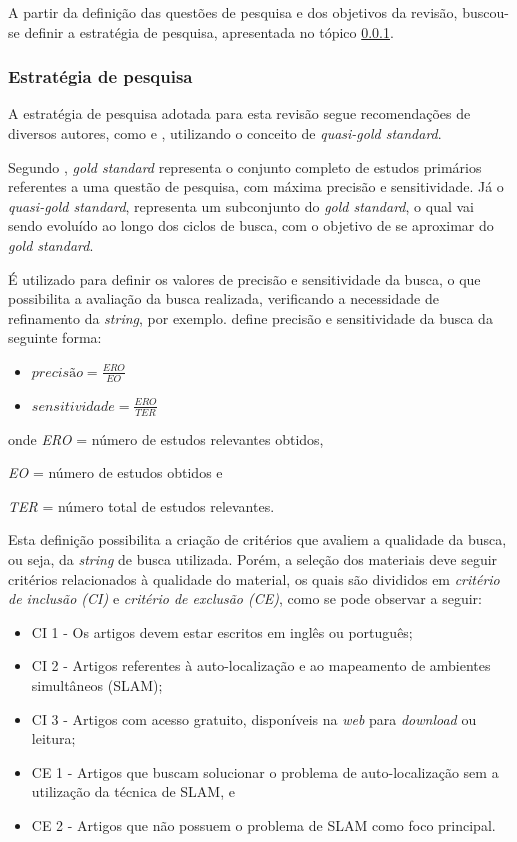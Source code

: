 		A partir da definição das questões de pesquisa e dos objetivos da revisão, buscou-se definir a estratégia de pesquisa, apresentada no tópico \ref{sub:estrategias_pesquisa}.

		\subsubsection{Estratégia de pesquisa}
		\label{sub:estrategias_pesquisa}

		A estratégia de pesquisa adotada para esta revisão segue recomendações de diversos autores, como \cite{Kitchenham} e \cite{systematicReviewEngSoft}, utilizando o conceito de \textit{quasi-gold standard}.

		Segundo \cite{quasi_goldES}, \textit{gold standard} representa o conjunto completo de estudos primários referentes a uma questão de pesquisa, com máxima precisão e sensitividade. Já o \textit{quasi-gold standard}, representa um subconjunto do \textit{gold standard}, o qual vai sendo evoluído ao longo dos ciclos de busca, com o objetivo de se aproximar do \textit{gold standard}. 

		É utilizado para definir os valores de precisão e sensitividade da busca, o que possibilita a avaliação da busca realizada, verificando a necessidade de refinamento da \textit{string}, por exemplo. \cite{quasi_goldES} define precisão e sensitividade da busca da seguinte forma:

		\begin{itemize}

			\item $precisão = \frac{ERO}{EO}$ 

			\item $sensitividade = \frac{ERO}{TER}$
		\end{itemize}

		onde \textit{ERO} = número de estudos relevantes obtidos,
		
		\textit{EO} = número de estudos obtidos e

		\textit{TER} = número total de estudos relevantes.

		Esta definição possibilita a criação de critérios que avaliem a qualidade da busca, ou seja, da \textit{string} de busca utilizada. Porém, a seleção dos materiais deve seguir critérios relacionados à qualidade do material, os quais são divididos em \textit{critério de inclusão (CI)} e \textit{critério de exclusão (CE)}, como se pode observar a seguir:

		\begin{itemize}
			\item CI 1 - Os artigos devem estar escritos em inglês ou português;
			\item CI 2 - Artigos referentes à auto-localização e ao mapeamento de ambientes simultâneos (SLAM);
			\item CI 3 - Artigos com acesso gratuito, disponíveis na \textit{web} para \textit{download} ou leitura;
			\item CE 1 - Artigos que buscam solucionar o problema de auto-localização sem a utilização da técnica de SLAM, e
			\item CE 2 - Artigos que não possuem o problema de SLAM como foco principal.
		\end{itemize}

